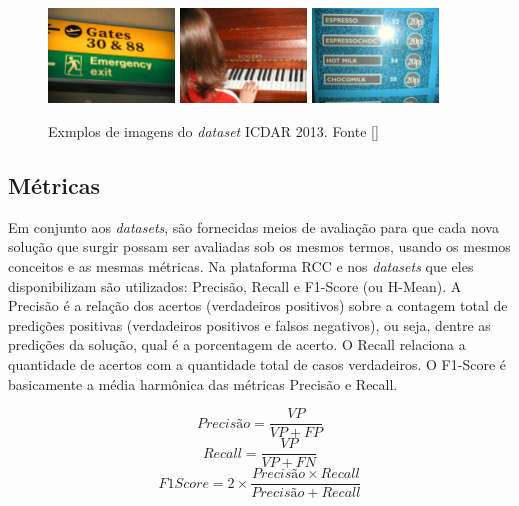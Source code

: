 \begin{figure}
    \centering
    \includegraphics[width=0.3\textwidth]{figs/img_20.jpg}
    \includegraphics[width=0.3\textwidth]{figs/img_85.jpg}
    \includegraphics[width=0.3\textwidth]{figs/img_225.jpg}
    \caption{Exmplos de imagens do \textit{dataset} ICDAR 2013. Fonte []}
    \label{fig:icdar2013_examples}
\end{figure}

\subsection{Métricas}\label{sec:methodology_metrics}
Em conjunto aos \textit{datasets}, são fornecidas meios de avaliação para que cada nova solução que surgir possam ser avaliadas sob os mesmos termos, usando os mesmos conceitos e as mesmas métricas. Na plataforma RCC e nos \textit{datasets} que eles disponibilizam são utilizados: Precisão, Recall e F1-Score (ou H-Mean). A Precisão é a relação dos acertos (verdadeiros positivos) sobre a contagem total de predições positivas (verdadeiros positivos e falsos negativos), ou seja, dentre as predições da solução, qual é a porcentagem de acerto. O Recall relaciona a quantidade de acertos com a quantidade total de casos verdadeiros. O F1-Score é basicamente a média harmônica das métricas Precisão e Recall.

\begin{equation}
    Precisão = \frac{VP}{VP + FP}
\end{equation}
\begin{equation}
    Recall = \frac{VP}{VP + FN}
\end{equation}
\begin{equation}
    F1Score = 2 \times \frac{Precisão \times Recall}{Precisão + Recall}
\end{equation}


